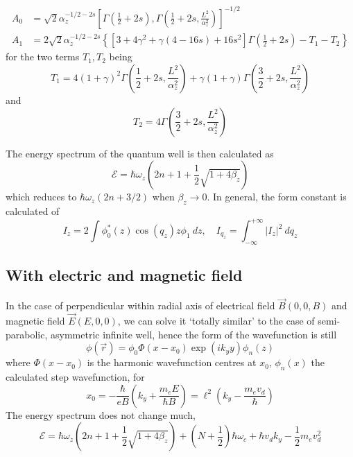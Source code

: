 \documentclass{article}
\begin{document}
\begin{align}
    A_{0} & = \sqrt{2}\alpha_{z}^{-1/2-2s} \left[\Gamma \left(\frac{1}{2}+2s\right), \Gamma\left(\frac{1}{2}+2s, \frac{L^{2}}{\alpha_{z}^{2}}\right)\right]^{-1/2}\\
    A_{1} & = 2\sqrt{2} \alpha_{z}^{-1/2-2s} \left\{ \left[3+4\gamma^{2}+\gamma(4-16s)+16s^{2}\right] \Gamma\left(\frac{1}{2}+2s\right)- T_{1} - T_{2}\right\}
\end{align}
for the two terms $T_{1},T_{2}$ being
\begin{equation}
    T_{1} = 4(1+\gamma)^{2} \Gamma\left(\frac{1}{2}+2s, \frac{L^{2}}{\alpha_{z}^{2}}\right) + \gamma(1+\gamma) \Gamma \left(\frac{3}{2}+2s, \frac{L^{2}}{\alpha_{z}^{2}}\right)
\end{equation}
and 
\begin{equation}
    T_{2} = 4\Gamma \left(\frac{3}{2}+2s, \frac{L^{2}}{\alpha_{z}^{2}} \right)
\end{equation}

The energy spectrum of the quantum well is then calculated as 
\begin{equation}
    \mathcal{E} = \hbar \omega_{z} \left( 2n+1 + \frac{1}{2}\sqrt{1+4\beta_{z}} \right)
\end{equation}
which reduces to $\hbar\omega_{z}(2n+3/2)$ when $\beta_{z}\to 0$. In general, the form constant is calculated of 
\begin{equation}
    I_{z} = 2\int \phi^{*}_{0}(z)\cos{(q_{z})z}\phi_{1}\:dz, \quad I_{q_{z}} = \int_{-\infty}^{+\infty} \lvert I_{z}\rvert^{2} \: dq_{z}
\end{equation}
\subsection{With electric and magnetic field}

In the case of perpendicular within radial axis of electrical field $\vec{B}(0,0,B)$ and magnetic field $\vec{E}(E,0,0)$, we can solve it `totally similar' to the case of semi-parabolic, asymmetric infinite well, hence the form of the wavefunction is still
\begin{equation} 
    \phi(\vec{r}) = \phi_{0}\Phi(x-x_0)\exp{(ik_{y}y)}\phi_{n}(z)
\end{equation}
where $\Phi(x-x_0)$ is the harmonic wavefunction centres at $x_{0}$, $\phi_{n}(x)$ the calculated step wavefunction, for \begin{equation}
    x_{0} = -\frac{\hbar}{eB} \left( k_{y} + \frac{m_{e}E}{\hbar B} \right) = \ell^{2} \left(k_y - \frac{m_e v_{d}}{\hbar}\right)
\end{equation}
The energy spectrum does not change much, 
\begin{equation}
    \mathcal{E} = \hbar \omega_{z} \left( 2n+1 + \frac{1}{2}\sqrt{1+4\beta_{z}} \right) + \left(N+\frac{1}{2}\right)\hbar \omega_{c} + \hbar v_{d} k_{y} - \frac{1}{2} m_{e}v_{d}^{2}
\end{equation}
\end{document}
